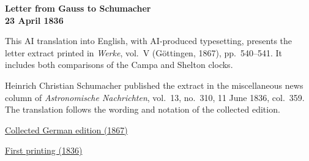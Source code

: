 \clearpage
\thispagestyle{empty}
\begin{center}\Large\textbf{Letter from Gauss to Schumacher\\23 April 1836}\end{center}

This AI translation into English, with AI-produced typesetting, presents the letter extract printed in \textit{Werke}, vol.~V (Göttingen, 1867), pp.~540--541. It includes both comparisons of the Campa and Shelton clocks.

Heinrich Christian Schumacher published the extract in the miscellaneous news column of \textit{Astronomische Nachrichten}, vol.~13, no.~310, 11 June 1836, col.~359. The translation follows the wording and notation of the collected edition.

\medskip\noindent
\href{https://gdz.sub.uni-goettingen.de/id/PPN236006339}{Collected German edition (1867)}\par
\noindent\href{https://www.digitale-sammlungen.de/view/bsb10049438?page=188}{First printing (1836)}
\clearpage
